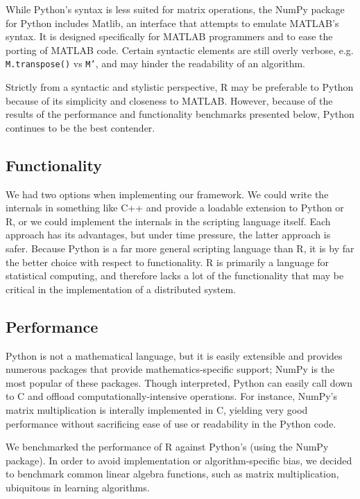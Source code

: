 \documentclass[%
  final,
  notitlepage,
  narroweqnarray,
  inline,
]{ieee}
\begin{document}
While Python's syntax is less suited for matrix operations, the NumPy
package~\cite{numpy} for Python includes Matlib, an interface that attempts to
emulate MATLAB's syntax. It is designed specifically for MATLAB programmers and
to ease the porting of MATLAB code. Certain syntactic elements are still overly
verbose, e.g. \texttt{M.transpose()} vs \texttt{M'}, and may hinder the
readability of an algorithm.

Strictly from a syntactic and stylistic perspective, R may be preferable to
Python because of its simplicity and closeness to MATLAB. However, because of
the results of the performance and functionality benchmarks presented below,
Python continues to be the best contender.

\subsection{Functionality}

We had two options when implementing our framework. We could write the
internals in something like C++ and provide a loadable extension to Python or
R, or we could implement the internals in the scripting language itself. Each
approach has its advantages, but under time pressure, the latter approach is
safer. Because Python is a far more general scripting language than R, it is by
far the better choice with respect to functionality. R is primarily a language
for statistical computing, and therefore lacks a lot of the functionality that
may be critical in the implementation of a distributed system.

\subsection{Performance}

Python is not a mathematical language, but it is easily extensible and provides
numerous packages that provide mathematics-specific support; NumPy is the most
popular of these packages. Though interpreted, Python can easily call down to C
and offload computationally-intensive operations. For instance, NumPy's matrix
multiplication is interally implemented in C, yielding very good performance
without sacrificing ease of use or readability in the Python code.

We benchmarked the performance of R against Python's (using the NumPy package).
In order to avoid implementation or algorithm-specific bias, we decided to
benchmark common linear algebra functions, such as matrix multiplication,
ubiquitous in learning algorithms.
\end{document}

